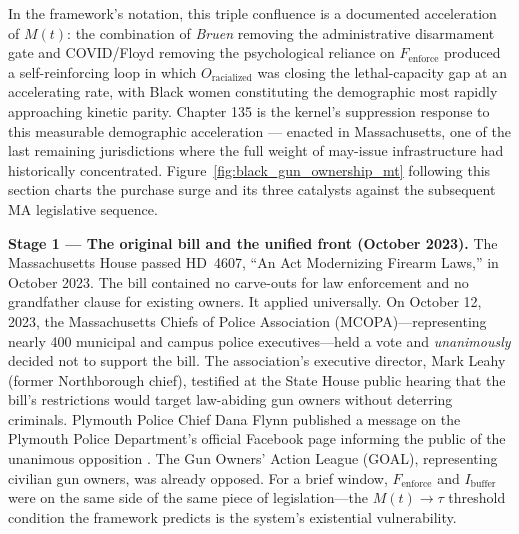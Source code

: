 \begin{keyinsight}
In the framework's notation, this triple confluence is a documented acceleration of $M(t)$: the combination of \textit{Bruen} removing the administrative disarmament gate and COVID/Floyd removing the psychological reliance on $F_{\text{enforce}}$ produced a self-reinforcing loop in which $O_{\text{racialized}}$ was closing the lethal-capacity gap at an accelerating rate, with Black women constituting the demographic most rapidly approaching kinetic parity. Chapter 135 is the kernel's suppression response to this measurable demographic acceleration --- enacted in Massachusetts, one of the last remaining jurisdictions where the full weight of may-issue infrastructure had historically concentrated. Figure~\ref{fig:black_gun_ownership_mt} following this section charts the purchase surge and its three catalysts against the subsequent MA legislative sequence.

\textbf{Stage 1 --- The original bill and the unified front (October 2023).} The Massachusetts House passed HD~4607, ``An Act Modernizing Firearm Laws,'' in October 2023. The bill contained no carve-outs for law enforcement and no grandfather clause for existing owners. It applied universally. On October 12, 2023, the Massachusetts Chiefs of Police Association (MCOPA)---representing nearly 400 municipal and campus police executives---held a vote and \textit{unanimously} decided not to support the bill. The association's executive director, Mark Leahy (former Northborough chief), testified at the State House public hearing that the bill's restrictions would target law-abiding gun owners without deterring criminals. Plymouth Police Chief Dana Flynn published a message on the Plymouth Police Department's official Facebook page informing the public of the unanimous opposition \cite{plymouth_pd_fb_2023, thetrace_mcopa_2023}. The Gun Owners' Action League (GOAL), representing civilian gun owners, was already opposed. For a brief window, $F_{\text{enforce}}$ and $I_{\text{buffer}}$ were on the same side of the same piece of legislation---the $M(t) \to \tau$ threshold condition the framework predicts is the system's existential vulnerability.


\end{keyinsight}
